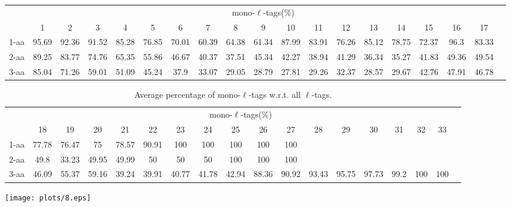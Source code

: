 \documentclass{article}
\begin{document}
\begin{table}[h]\tiny
\vspace{3mm}
{\centering
\begin{center}
\begin{tabular}{|l|c|c|c|c|c|c|c|c|c|c|c|c|c|c|c|c|c|c|}
  \hline
  & \multicolumn{ 17 }{|c|}{mono-$\ell$-tags(\%)} \\
  \cline{2- 18}
    & 1 & 2 & 3 & 4 & 5 & 6 & 7 & 8 & 9 & 10 & 11 & 12 & 13 & 14 & 15 & 16 & 17\\
  \hline
1-aa  & 95.69 & 92.36 & 91.52 & 85.28 & 76.85 & 70.01 & 60.39 & 64.38 & 61.34 & 87.99 & 83.91 & 76.26 & 85.12 & 78.75 & 72.37 & 96.3 & 83.33\\
2-aa  & 89.25 & 83.77 & 74.76 & 65.35 & 55.86 & 46.67 & 40.37 & 37.51 & 45.34 & 42.27 & 38.94 & 41.29 & 36.34 & 35.27 & 41.83 & 49.36 & 49.54\\
3-aa  & 85.04 & 71.26 & 59.01 & 51.09 & 45.24 & 37.9 & 33.07 & 29.05 & 28.79 & 27.81 & 29.26 & 32.37 & 28.57 & 29.67 & 42.76 & 47.91 & 46.78\\
 \hline
\end{tabular}
\end{center}
\par}
\centering

\vspace{3mm}
\label{table:table7}
\end{table}
\begin{table}[h]\tiny
\vspace{3mm}
{\centering
\begin{center}
\begin{tabular}{|l|c|c|c|c|c|c|c|c|c|c|c|c|c|c|c|c|c|}
  \hline
  & \multicolumn{ 16 }{|c|}{mono-$\ell$-tags(\%)} \\
  \cline{2- 17}
    & 18 & 19 & 20 & 21 & 22 & 23 & 24 & 25 & 26 & 27 & 28 & 29 & 30 & 31 & 32 & 33\\
  \hline
1-aa  & 77.78 & 76.47 & 75 & 78.57 & 90.91 & 100 & 100 & 100 & 100 & 100 &  &  &  &  &  & \\
2-aa  & 49.8 & 33.23 & 49.95 & 49.99 & 50 & 50 & 50 & 100 & 100 & 100 &  &  &  &  &  & \\
3-aa  & 46.09 & 55.37 & 59.16 & 39.24 & 39.91 & 40.77 & 41.78 & 42.94 & 88.36 & 90.92 & 93.43 & 95.75 & 97.73 & 99.2 & 100 & 100\\
 \hline
\end{tabular}
\end{center}
\par}
\centering

\caption{ Average percentage of mono-$\ell$-tags w.r.t. all $\ell$-tags.}

\vspace{3mm}
\label{table:table7}
\end{table}
\texttt{[image: plots/8.eps]}
\end{document}
